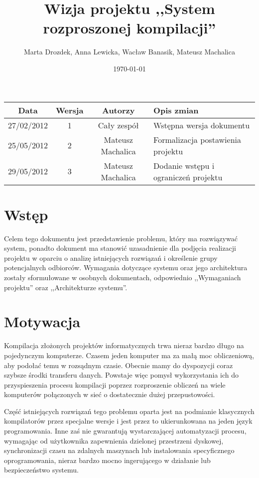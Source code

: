 \documentclass[a4paper]{article}
\title{Wizja projektu ,,System rozproszonej kompilacji''}
\author{Marta Drozdek, Anna Lewicka, Wacław Banasik, Mateusz Machalica}
\date{\today}
\begin{document}
\maketitle

\begin{table}[!h]
	\centering
	\begin{tabular}{|c|c|c|p{9cm}|}
		\hline
		\textbf{Data} & \textbf{Wersja} & \textbf{Autorzy} & \textbf{Opis zmian} \\ \hline
		27/02/2012 & 1 & Cały zespół & Wstępna wersja dokumentu \\ \hline
		25/05/2012 & 2 & Mateusz Machalica & Formalizacja postawienia projektu \\ \hline
		29/05/2012 & 3 & Mateusz Machalica & Dodanie wstępu i ograniczeń projektu \\ \hline
	\end{tabular}
\end{table}

\section{Wstęp}

Celem tego dokumentu jest przedstawienie problemu, który ma rozwiązywać system, ponadto dokument ma stanowić uzasadnienie dla podjęcia realizacji projektu w oparciu o analizę istniejących rozwiązań i określenie grupy potencjalnych odbiorców.
Wymagania dotyczące systemu oraz jego architektura zostały sformułowane w osobnych dokumentach, odpowiednio ,,Wymaganiach projektu'' oraz ,,Architekturze systemu''.

\section{Motywacja}

Kompilacja złożonych projektów informatycznych trwa nieraz bardzo długo na pojedynczym komputerze. Czasem jeden komputer ma za małą moc obliczeniową, aby podołać temu w rozsądnym czasie. Obecnie mamy do dyspozycji coraz szybsze środki transferu danych. Powstaje więc pomysł wykorzystania ich do przyspieszenia procesu kompilacji poprzez rozproszenie obliczeń na wiele komputerów połączonych w sieć o dostatecznie dużej przepustowości.

Część istniejących rozwiązań tego problemu oparta jest na podmianie klasycznych kompilatorów przez specjalne wersje i jest przez to ukierunkowana na jeden język programowania. Inne zaś nie gwarantują wystarczającej automatyzacji procesu, wymagając od użytkownika zapewnienia dzielonej przestrzeni dyskowej, synchronizacji czasu na zdalnych maszynach lub instalowania specyficznego oprogramowania, nieraz bardzo mocno ingerującego w działanie lub bezpieczeństwo systemu.
\end{document}
